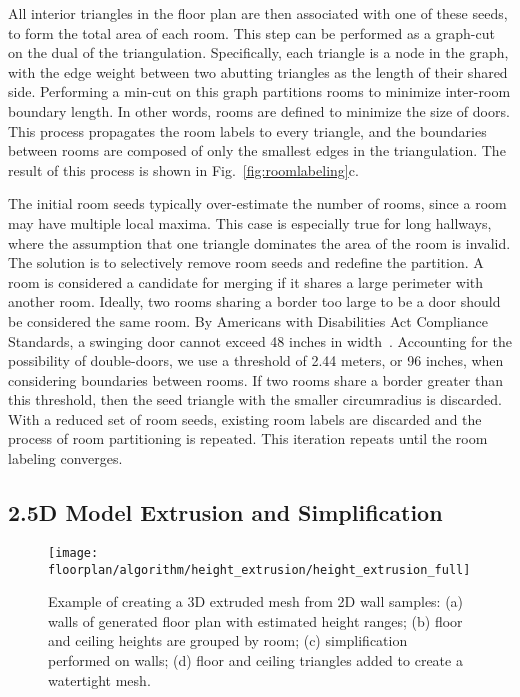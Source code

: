 \documentclass[10pt,twocolumn,twoside]{IEEEtran}
\begin{document}
All interior triangles in the floor plan are then associated with one of these seeds, to form the total area of each room.  This step can be performed as a graph-cut on the dual of the triangulation.  Specifically, each triangle is a node in the graph, with the edge weight between two abutting triangles as the length of their shared side.  Performing a min-cut on this graph partitions rooms to minimize inter-room boundary length.  In other words, rooms are defined to minimize the size of doors.  This process propagates the room labels to every triangle, and the boundaries between rooms are composed of only the smallest edges in the triangulation.  The result of this process is shown in Fig.~\ref{fig:roomlabeling}c.

The initial room seeds typically over-estimate the number of rooms, since a room may have multiple local maxima.  This case is especially true for long hallways, where the assumption that one triangle dominates the area of the room is invalid.  The solution is to selectively remove room seeds and redefine the partition. A room is considered a candidate for merging if it shares a large perimeter with another room.  Ideally, two rooms sharing a border too large to be a door should be considered the same room.  By Americans with Disabilities Act Compliance Standards, a swinging door cannot exceed 48 inches in width~\cite{ADACompliance}.  Accounting for the possibility of double-doors, we use a threshold of 2.44 meters, or 96 inches, when considering boundaries between rooms.  If two rooms share a border greater than this threshold, then the seed triangle with the smaller circumradius is discarded.  With a reduced set of room seeds, existing room labels are discarded and the process of room partitioning is repeated.  This iteration repeats until the room labeling converges.

\subsection{2.5D Model Extrusion and Simplification}
\label{ssec:extrusion}

\begin{figure}[t]
  \centering
  \texttt{[image: floorplan/algorithm/height\_extrusion/height\_extrusion\_full]}
  \caption{Example of creating a 3D extruded mesh from 2D wall samples:  (a) walls of generated floor plan with estimated height ranges; (b) floor and ceiling heights are grouped by room; (c) simplification performed on walls; (d) floor and ceiling triangles added to create a watertight mesh. }
  \label{fig:heightextrusion}
\end{figure}
\end{document}
